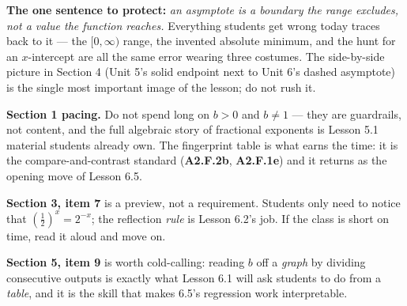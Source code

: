 \documentclass[10pt]{article}
\begin{document}
\begin{teachernote}
\textbf{The one sentence to protect:} \emph{an asymptote is a boundary the range excludes, not a
value the function reaches.} Everything students get wrong today traces back to it --- the
$[0,\infty)$ range, the invented absolute minimum, and the hunt for an $x$-intercept are all the same
error wearing three costumes. The side-by-side picture in Section 4 (Unit 5's solid endpoint next to
Unit 6's dashed asymptote) is the single most important image of the lesson; do not rush it.

\textbf{Section 1 pacing.} Do not spend long on $b>0$ and $b\ne1$ --- they are guardrails, not
content, and the full algebraic story of fractional exponents is Lesson 5.1 material students
already own. The fingerprint table is what earns the time: it is the compare-and-contrast standard
(\textbf{A2.F.2b}, \textbf{A2.F.1e}) and it returns as the opening move of Lesson 6.5.

\textbf{Section 3, item 7} is a preview, not a requirement. Students only need to notice that
$\left(\frac12\right)^{x}=2^{-x}$; the reflection \emph{rule} is Lesson 6.2's job. If the class is
short on time, read it aloud and move on.

\textbf{Section 5, item 9} is worth cold-calling: reading $b$ off a \emph{graph} by dividing
consecutive outputs is exactly what Lesson 6.1 will ask students to do from a \emph{table}, and it
is the skill that makes 6.5's regression work interpretable.
\end{teachernote}
\end{document}
